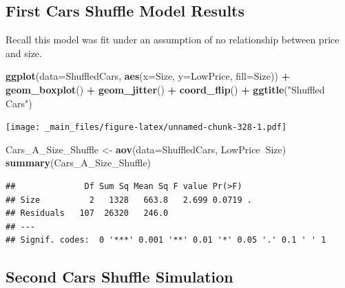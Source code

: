 \documentclass[]{book}
\newenvironment{Shaded}{\begin{snugshade}}{\end{snugshade}}
\newcommand{\KeywordTok}[1]{\textcolor[rgb]{0.13,0.29,0.53}{\textbf{#1}}}
\newcommand{\DataTypeTok}[1]{\textcolor[rgb]{0.13,0.29,0.53}{#1}}
\newcommand{\DecValTok}[1]{\textcolor[rgb]{0.00,0.00,0.81}{#1}}
\newcommand{\StringTok}[1]{\textcolor[rgb]{0.31,0.60,0.02}{#1}}
\newcommand{\OperatorTok}[1]{\textcolor[rgb]{0.81,0.36,0.00}{\textbf{#1}}}
\newcommand{\NormalTok}[1]{#1}
\begin{document}
\subsection{First Cars Shuffle Model
Results}\label{first-cars-shuffle-model-results-1}

Recall this model was fit under an assumption of no relationship between
price and size.

\begin{Shaded}
\begin{Highlighting}[]
\KeywordTok{ggplot}\NormalTok{(}\DataTypeTok{data=}\NormalTok{ShuffledCars, }\KeywordTok{aes}\NormalTok{(}\DataTypeTok{x=}\NormalTok{Size, }\DataTypeTok{y=}\NormalTok{LowPrice, }\DataTypeTok{fill=}\NormalTok{Size)) }\OperatorTok{+}\StringTok{ }
\StringTok{  }\KeywordTok{geom_boxplot}\NormalTok{() }\OperatorTok{+}\StringTok{ }\KeywordTok{geom_jitter}\NormalTok{() }\OperatorTok{+}\StringTok{ }\KeywordTok{coord_flip}\NormalTok{() }\OperatorTok{+}\StringTok{ }\KeywordTok{ggtitle}\NormalTok{(}\StringTok{"Shuffled Cars"}\NormalTok{)}
\end{Highlighting}
\end{Shaded}

\texttt{[image: \_main\_files/figure-latex/unnamed-chunk-328-1.pdf]}

\begin{Shaded}
\begin{Highlighting}[]
\NormalTok{Cars_A_Size_Shuffle <-}\StringTok{ }\KeywordTok{aov}\NormalTok{(}\DataTypeTok{data=}\NormalTok{ShuffledCars, LowPrice}\OperatorTok{~}\NormalTok{Size)}
\KeywordTok{summary}\NormalTok{(Cars_A_Size_Shuffle)}
\end{Highlighting}
\end{Shaded}

\begin{verbatim}
##              Df Sum Sq Mean Sq F value Pr(>F)  
## Size          2   1328   663.8   2.699 0.0719 .
## Residuals   107  26320   246.0                 
## ---
## Signif. codes:  0 '***' 0.001 '**' 0.01 '*' 0.05 '.' 0.1 ' ' 1
\end{verbatim}

\subsection{Second Cars Shuffle
Simulation}\label{second-cars-shuffle-simulation-1}

\begin{Shaded}
\end{Shaded}
\end{document}
